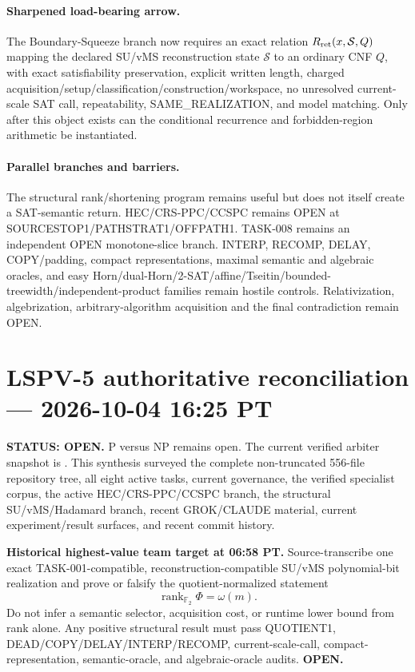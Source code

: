 \documentclass[11pt]{article}
\begin{document}
\paragraph{Sharpened load-bearing arrow.}
The Boundary-Squeeze branch now requires an exact relation $R_{\rm ret}(x,\mathcal S,Q)$ mapping the declared SU/vMS reconstruction state $\mathcal S$ to an ordinary CNF $Q$, with exact satisfiability preservation, explicit written length, charged acquisition/setup/classification/construction/workspace, no unresolved current-scale SAT call, repeatability, SAME\_REALIZATION, and model matching. Only after this object exists can the conditional recurrence and forbidden-region arithmetic be instantiated.

\paragraph{Parallel branches and barriers.}
The structural rank/shortening program remains useful but does not itself create a SAT-semantic return. HEC/CRS-PPC/CCSPC remains OPEN at SOURCESTOP1/PATHSTRAT1/OFFPATH1. TASK-008 remains an independent OPEN monotone-slice branch. INTERP, RECOMP, DELAY, COPY/padding, compact representations, maximal semantic and algebraic oracles, and easy Horn/dual-Horn/2-SAT/affine/Tseitin/bounded-treewidth/independent-product families remain hostile controls. Relativization, algebrization, arbitrary-algorithm acquisition and the final contradiction remain OPEN.




\section{LSPV-5 authoritative reconciliation --- 2026-10-04 16:25 PT}
\textbf{STATUS: OPEN.} P versus NP remains open. The current verified arbiter snapshot is
. This synthesis surveyed the
complete non-truncated 556-file repository tree, all eight active tasks, current governance,
the verified specialist corpus, the active HEC/CRS-PPC/CCSPC branch, the structural
SU/vMS/Hadamard branch, recent GROK/CLAUDE material, current experiment/result surfaces,
and recent commit history.

\begin{candidatebox}
\textbf{Historical highest-value team target at 06:58 PT.}
Source-transcribe one exact TASK-001-compatible, reconstruction-compatible SU/vMS
polynomial-bit realization and prove or falsify the quotient-normalized statement
\[
\operatorname{rank}_{\mathbb F_2}\Phi=\omega(m).
\]
Do not infer a semantic selector, acquisition cost, or runtime lower bound from rank alone.
Any positive structural result must pass QUOTIENT1, DEAD/COPY/DELAY/INTERP/RECOMP,
current-scale-call, compact-representation, semantic-oracle, and algebraic-oracle audits.
\textbf{OPEN.}
\end{candidatebox}
\end{document}
